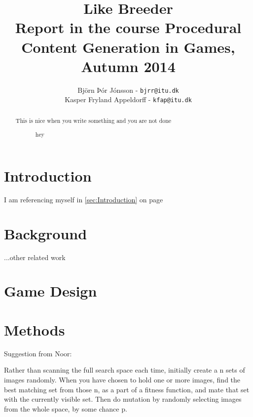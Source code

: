 \documentclass[]{article}
\title{Like Breeder\\ \small Report in the course Procedural Content Generation in Games, Autumn 2014}
\author{Björn Þór Jónsson - \texttt{bjrr@itu.dk}\\Kasper Fryland Appeldorff - \texttt{kfap@itu.dk}}
\begin{document}

\maketitle
\listoftodos %
\newpage
\begin{abstract}
This is nice when you write something and you are not done 
\begin{figure}[h!]
\caption{hey}
\label{fig:test}
\end{figure}
\end{abstract}

\section{Introduction}
\label{sec:Introduction}
I am referencing myself in \autoref{sec:Introduction} on page \pageref{sec:Introduction}
\section{Background}
\label{sec:Background}

...other related work


\section{Game Design}
\label{sec:GameDesign}



\section{Methods}
\label{sec:Methods}

Suggestion from Noor:

Rather than scanning the full search space each time, initially create a n sets of images randomly.  When you have chosen to hold one or more images, find the best matching set from those n, as a part of a fitness function, and mate that set with the currently visible set.  Then do mutation by randomly selecting images from the whole space, by some chance p.
\end{document}
